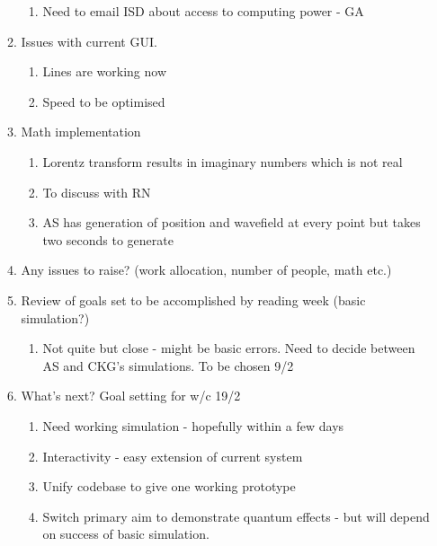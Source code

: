 \begin{enumerate}
\begin{enumerate}
\begin{enumerate}
\item  Need to email ISD about access to computing power - GA
\end{enumerate}

\item  Issues with current GUI.

\begin{enumerate}
\item  Lines are working now

\item  Speed to be optimised
\end{enumerate}

\item  Math implementation

\begin{enumerate}
\item  Lorentz transform results in imaginary numbers which is not real

\item  To discuss with RN

\item  AS has generation of position and wavefield at every point but takes two seconds to generate
\end{enumerate}

\item  Any issues to raise? (work allocation, number of people,  math etc.)

\item  Review of goals set to be accomplished by reading week (basic simulation?)

\begin{enumerate}
\item  Not quite but close - might be basic errors. Need to decide between AS and CKG's simulations. To be chosen 9/2
\end{enumerate}

\item  What's next? Goal setting for w/c 19/2

\begin{enumerate}
\item  Need working simulation - hopefully within a few days

\item  Interactivity - easy extension of current system

\item  Unify codebase to give one working prototype

\item  Switch primary aim to demonstrate quantum effects - but will depend on success of basic simulation.
\end{enumerate}


\end{enumerate}
\end{enumerate}
